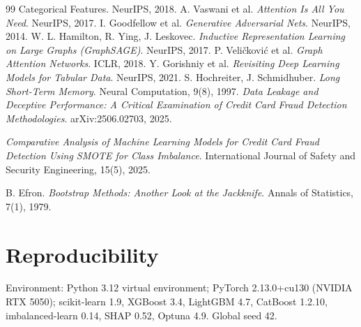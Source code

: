 \documentclass[11pt,a4paper]{article}
\begin{document}
\begin{thebibliography}{99}
{Categorical Features}. NeurIPS, 2018.
 A. Vaswani et al. \emph{Attention Is All You Need}. NeurIPS, 2017.
 I. Goodfellow et al. \emph{Generative Adversarial Nets}. NeurIPS, 2014.
 W. L. Hamilton, R. Ying, J. Leskovec. \emph{Inductive Representation
Learning on Large Graphs (GraphSAGE)}. NeurIPS, 2017.
 P. Veli\v{c}kovi\'c et al. \emph{Graph Attention Networks}. ICLR, 2018.
 Y. Gorishniy et al. \emph{Revisiting Deep Learning Models for Tabular Data}.
NeurIPS, 2021.
 S. Hochreiter, J. Schmidhuber. \emph{Long Short-Term Memory}. Neural
Computation, 9(8), 1997.
 \emph{Data Leakage and Deceptive Performance: A Critical Examination of
Credit Card Fraud Detection Methodologies}. arXiv:2506.02703, 2025.

 \emph{Comparative Analysis of Machine Learning Models for Credit Card Fraud
Detection Using SMOTE for Class Imbalance}. International Journal of Safety and Security
Engineering, 15(5), 2025.

 B. Efron. \emph{Bootstrap Methods: Another Look at the Jackknife}. Annals of
Statistics, 7(1), 1979.
\end{thebibliography}

\appendix
\section{Reproducibility}

Environment: Python 3.12 virtual environment; PyTorch 2.13.0+cu130 (NVIDIA RTX 5050);
scikit-learn 1.9, XGBoost 3.4, LightGBM 4.7, CatBoost 1.2.10, imbalanced-learn 0.14,
SHAP 0.52, Optuna 4.9. Global seed 42.
\end{document}
